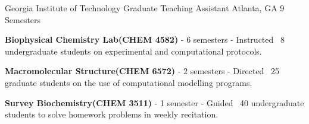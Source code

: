 \begin{cventries}
  \cventry
    {Georgia Institute of Technology} %
    {Graduate Teaching Assistant} %
    {Atlanta, GA} %
    {9 Semesters} %
    {
      \begin{cvitems} %
        \item {\textbf{Biophysical Chemistry Lab{\scriptsize (CHEM 4582)}} - 6 semesters - Instructed ~8 undergraduate students on experimental and computational protocols.}
        \item {\textbf{Macromolecular Structure{\scriptsize (CHEM 6572)}} - 2 semesters - Directed ~25 graduate students on the use of computational modelling programs.}
        \item {\textbf{Survey Biochemistry{\scriptsize (CHEM 3511)}} - 1 semester - Guided ~40 undergraduate students to solve homework problems in weekly recitation.}
      \end{cvitems}
    }


\vspace{-4.0mm}
\end{cventries}
